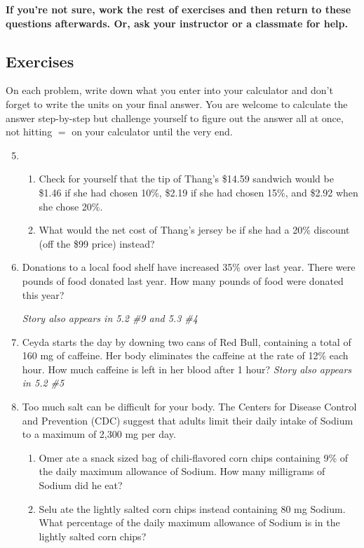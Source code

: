 \noindent \textbf{If you're not sure, work the rest of exercises and then return to these questions afterwards.  Or, ask your instructor or a classmate for help.}

\subsection*{Exercises}

On each problem, write down what you enter into your calculator and don't forget to write the units on your final answer.  You are welcome to calculate the answer step-by-step but challenge yourself to figure out the answer all at once, not hitting $=$ on your calculator until the very end.

\begin{enumerate} 
\setcounter{enumi}{4}

\item \begin{enumerate}
\item Check for yourself that the tip of Thang's \$14.59 sandwich would be \$1.46 if she had chosen 10\%, \$2.19 if she had chosen 15\%, and \$2.92 when she chose 20\%.
\item What would the net cost of Thang's jersey be if she had a 20\% discount (off the \$99 price) instead?
\end{enumerate}

 \item Donations to a local food shelf have increased 35\% over last year.  There were  pounds of food donated last year. How many pounds of food were donated this year? 
 
 \hfill \emph{Story also appears in 5.2 \#9 and 5.3 \#4} 

\item Ceyda starts the day by downing two cans of Red Bull, containing a total of 160 mg of caffeine.  Her body eliminates the caffeine at the rate of 12\% each hour. How much caffeine is left in her blood after 1 hour?  \hfill \emph{Story also appears in 5.2 \#5}

\item Too much salt can be difficult for your body.  The Centers for Disease Control and Prevention (CDC) suggest that adults limit their daily intake of Sodium to a maximum of 2,300 mg per day.
\begin{enumerate}
\item Omer ate a snack sized bag of chili-flavored corn chips containing 9\% of the daily maximum allowance of Sodium.  How many milligrams of Sodium did he eat?
\item Selu ate the lightly salted corn chips instead containing 80 mg Sodium.  What percentage of the daily maximum allowance of Sodium is in the lightly salted corn chips?
\end{enumerate}


\end{enumerate}

